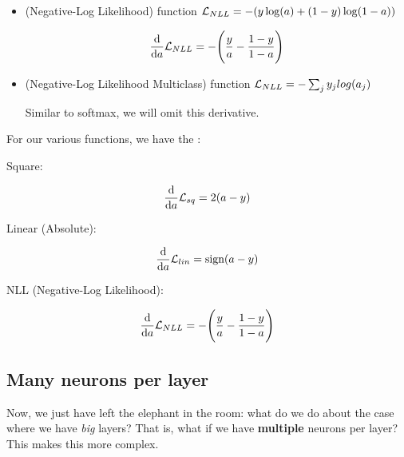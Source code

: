 \begin{itemize}
            \item {} (Negative-Log Likelihood) function $\mathcal{L}_{NLL} = -( y \log(a) + (1-y) \log(1-a) )$
            
                \begin{equation}
                    \frac{\dd }{\dd a} \mathcal{L}_{NLL} = - \Bigg( \frac{y}{a} - \frac{1-y}{1-a} \Bigg)
                \end{equation}
            
            \item {} (Negative-Log Likelihood Multiclass) function $\mathcal{L}_{NLL} = - \sum_j y_jlog(a_j)$
            
                Similar to softmax, we will omit this derivative.\\
        \end{itemize}
        
        \begin{notation}
            For our various  functions, we have the :
            
            Square:
            
            \begin{equation*}
                \frac{\dd }{\dd a} \mathcal{L}_{sq} = 2(a-y)
            \end{equation*}
            
            Linear (Absolute):
            
            \begin{equation*}
                \frac{\dd }{\dd a} \mathcal{L}_{lin} = \text{sign}(a-y)
            \end{equation*}
            
            NLL (Negative-Log Likelihood):
            
            \begin{equation*}
                \frac{\dd }{\dd a} \mathcal{L}_{NLL} = - \Bigg( \frac{y}{a} - \frac{1-y}{1-a} \Bigg)
            \end{equation*}
        \end{notation}
        
    \secdiv
    
    \subsection{Many neurons per layer}
    
        Now, we just have left the elephant in the room: what do we do about the case where we have \textit{big} layers? That is, what if we have \textbf{multiple} neurons per layer? This makes this more complex.
        
